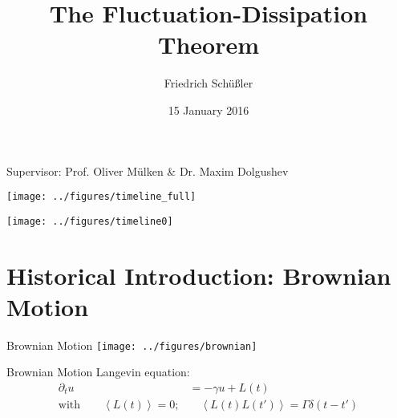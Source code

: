 \documentclass[xcolor=x11names,compress]{beamer}
\renewcommand{\(}{\begin{columns}}
\renewcommand{\)}{\end{columns}}
\newcommand{\<}[1]{\begin{column}{#1}}
\renewcommand{\>}{\end{column}}
\begin{document}
\begin{frame}{}
\title[FTD]{The Fluctuation-Dissipation Theorem}
\author{
Friedrich Schüßler}
\date{\normalsize 15 January 2016}
\titlepage

\centering 
Supervisor: Prof. Oliver Mülken \& Dr. Maxim Dolgushev 
\end{frame}



\begin{frame}[t]{}
    \texttt{[image: ../figures/timeline\_full]}
\end{frame}
\begin{frame}[t]{}
    \texttt{[image: ../figures/timeline0]}
\end{frame}

\section{Historical Introduction: Brownian Motion}
\label{sec:brownian_motion}

\begin{frame}{Brownian Motion}
    \texttt{[image: ../figures/brownian]}
\end{frame}

\begin{frame}[t]{Brownian Motion}
Langevin equation:
\begin{align*}
    \partial_t u &= -\gamma u + L(t) \\
    \text{with} \qquad \left \langle L(t) \right \rangle = 0; &\quad 
        \left \langle L(t)L(t') \right \rangle = \Gamma \delta(t - t') 
\end{align*}
\end{frame}
\end{document}
